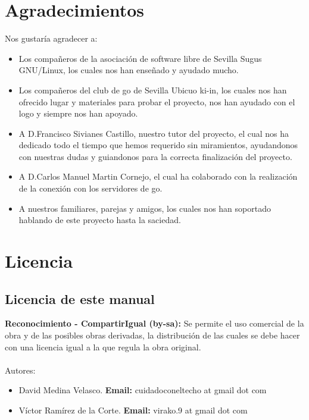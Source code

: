 \documentclass[12pt,a4paper]{report}
\begin{document}
\chapter{Agradecimientos}
Nos gustaría agradecer a:
\begin{itemize}
\item Los compañeros de la asociación de software libre de Sevilla Sugus GNU/Linux, los cuales nos han enseñado y ayudado mucho.
\item Los compañeros del club de go de Sevilla Ubicuo ki-in, los cuales nos han ofrecido lugar y materiales para probar el proyecto, nos han ayudado con el logo y siempre nos han apoyado. 
\item A D.Francisco Sivianes Castillo, nuestro tutor del proyecto, el cual nos ha dedicado todo el tiempo que hemos requerido sin miramientos, ayudandonos con nuestras dudas y guiandonos para la correcta finalización del proyecto.
\item A D.Carlos Manuel Martin Cornejo, el cual ha colaborado con la realización de la conexión con los servidores de go.
\item A nuestros familiares, parejas y amigos, los cuales nos han soportado hablando de este proyecto hasta la saciedad.
 
\end{itemize}


\chapter{Licencia}

\section{Licencia de este manual}

\textbf{Reconocimiento - CompartirIgual (by-sa):} Se permite el uso comercial de la obra y de las posibles obras derivadas, la distribución de las cuales se debe hacer con una licencia igual a la que regula la obra original. \\ \\


Autores: 
\begin{itemize}
\item David Medina Velasco. \textbf{Email:} cuidadoconeltecho at gmail dot com 
\item Víctor Ramírez de la Corte. \textbf{Email:} virako.9 at gmail dot com
\end{itemize}
\end{document}
